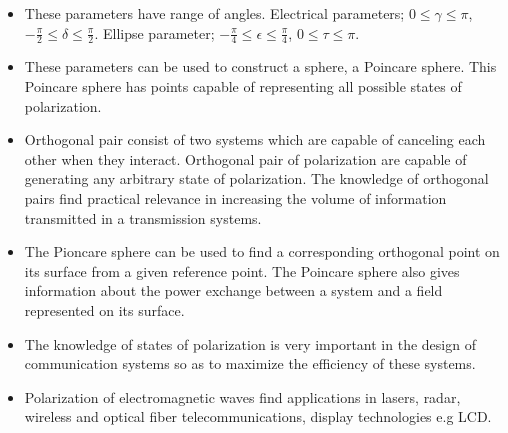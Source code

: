 \begin{itemize}
\begin{tabular}{lccl}
		\end{tabular}
		\item These parameters have range of angles. Electrical parameters; $ 0 \leq \gamma \leq \pi $, $ -\frac{\pi}{2} \leq \delta \leq \frac{\pi}{2}$. Ellipse parameter; $ -\frac{\pi}{4} \leq \epsilon \leq \frac{\pi}{4}$, $ 0 \leq \tau \leq \pi $.
		\item These parameters can be used to construct a sphere, a Poincare sphere. This Poincare sphere has points capable of representing all possible states of polarization.
		\item  Orthogonal pair consist of two systems which are capable of canceling each other when they interact. Orthogonal pair of polarization are capable of generating any arbitrary state of polarization. The knowledge of orthogonal pairs find practical relevance in increasing the volume of information transmitted in a transmission systems. 
		\item The Pioncare sphere can be used to find a corresponding orthogonal point on its surface from a given reference point. The Poincare sphere also gives information about the power exchange between a system and a field represented on its surface.
		\item The knowledge of states of polarization is very important in the design of communication systems so as to maximize the efficiency of these systems. 
		\item  Polarization of electromagnetic waves find applications in lasers, radar, wireless and optical fiber telecommunications, display technologies e.g LCD.
		
	\end{itemize}